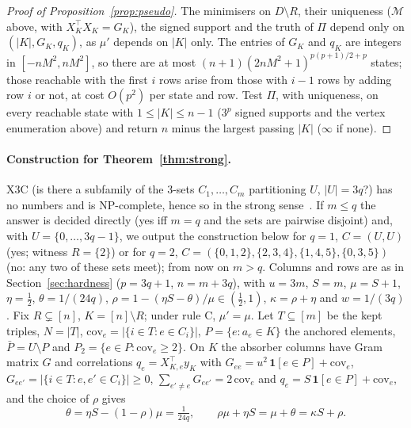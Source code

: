 \documentclass[10pt,a4paper]{article}
\theoremstyle{plain}
\theoremstyle{definition}
\theoremstyle{remark}
\newcommand{\Dm}{D\setminus R}
\newcommand{\tsc}[1]{\textnormal{\textsc{#1}}}  %
\begin{document}
\begin{proof}[Proof of Proposition~\ref{prop:pseudo}]
The minimisers on $\Dm$, their uniqueness ($\mathcal M$ above, with $X_K^{\top}X_K=G_K$), the signed support and the truth of $\Pi$ depend only on $(|K|,G_K,q_K)$, as $\mu'$ depends on $|K|$ only. The entries of $G_K$ and $q_K$ are integers in $[-nM^2,nM^2]$, so there are at most $(n+1)(2nM^2+1)^{p(p+1)/2+p}$ states; those reachable with the first $i$ rows arise from those with $i-1$ rows by adding row $i$ or not, at cost $O(p^2)$ per state and row. Test $\Pi$, with uniqueness, on every reachable state with $1\le|K|\le n-1$ ($3^p$ signed supports and the vertex enumeration above) and return $n$ minus the largest passing $|K|$ ($\infty$ if none).
\end{proof}

\paragraph{Construction for Theorem~\ref{thm:strong}.} \tsc{X3C} (is there a subfamily of the 3-sets $C_1,\dots,C_m$ partitioning $U$, $|U|=3q$?) has no numbers and is NP-complete, hence so in the strong sense~\citep{garey1979}. If $m\le q$ the answer is decided directly (yes iff $m=q$ and the sets are pairwise disjoint) and, with $U=\{0,\dots,3q-1\}$, we output the construction below for $q=1$, $C=(U,U)$ (yes; witness $R=\{2\}$) or for $q=2$, $C=(\{0,1,2\},\{2,3,4\},\{1,4,5\},\{0,3,5\})$ (no: any two of these sets meet); from now on $m>q$. Columns and rows are as in Section~\ref{sec:hardness} ($p=3q+1$, $n=m+3q$), with $u=3m$, $S=m$, $\mu=S+1$, $\eta=\frac12$, $\theta=1/(24q)$, $\rho=1-(\eta S-\theta)/\mu\in(\frac12,1)$, $\kappa=\rho+\eta$ and $w=1/(3q)$. Fix $R\subsetneq[n]$, $K=[n]\setminus R$; under rule C, $\mu'=\mu$. Let $T\subseteq[m]$ be the kept triples, $N=|T|$, $\mathrm{cov}_e=|\{i\in T:e\in C_i\}|$, $P=\{e:a_e\in K\}$ the anchored elements, $\bar P=U\setminus P$ and $P_2=\{e\in P:\mathrm{cov}_e\ge2\}$. On $K$ the absorber columns have Gram matrix $G$ and correlations $q_e=X_{K,e}^{\top}y_K$ with $G_{ee}=u^2\,\mathbf 1[e\in P]+\mathrm{cov}_e$, $G_{ee'}=|\{i\in T:e,e'\in C_i\}|\ge0$, $\sum_{e'\ne e}G_{ee'}=2\,\mathrm{cov}_e$ and $q_e=S\,\mathbf 1[e\in P]+\mathrm{cov}_e$, and the choice of $\rho$ gives
\begin{equation}\label{eq:theta}
\theta=\eta S-(1-\rho)\mu=\tfrac1{24q},\qquad \rho\mu+\eta S=\mu+\theta=\kappa S+\rho .
\end{equation}
\end{document}
